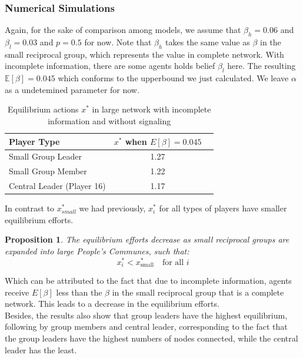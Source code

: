 \documentclass[12pt]{article}
\newtheorem{proposition}{Proposition}
\begin{document}
\subsubsection*{Numerical Simulations}
Again, for the sake of comparison among models, we assume that $\beta_h=0.06$ and $\beta_l=0.03$ and $p=0.5$ for now. Note that $\beta_h$ takes the same value as $\beta$ in the small reciprocal group, which represents the value in complete network. With incomplete information, there are some agents holds belief $\beta_l$ here. The resulting $\mathbb{E}[\beta]=0.045$ which conforms to the upperbound we just calculated. We leave $\alpha$ as a undetemined parameter for now.\\
\begin{table}[H]
  \centering
  \begin{tabular}{lcc}
  \toprule
  \textbf{Player Type}  & \textbf{\( x^* \) when \( E[\beta] = 0.045 \)} \\
  \midrule
  Small Group Leader        & 1.27 \\
  Small Group Member        & 1.22 \\
  Central Leader (Player 16)  & 1.17 \\
  \bottomrule
  \end{tabular}
  \caption{Equilibrium actions \( x^* \) in large network with incomplete information and without signaling}
  \label{tab:xstar-beta}
  \end{table}
In contrast to $x^*_{small}$ we had previously, $x^*_i$ for all types of players have smaller equilibrium efforts.\\
\begin{proposition}
  The equilibrium efforts decrease as small reciprocal groups are expanded into large People's Communes, such that:
  \[
  x^*_i < x^*_{\text{small}} \quad \text{for all } i
  \]
  \end{proposition}
  Which can be attributed to the fact that due to incomplete information, agents receive $E[\beta]$ less than the $\beta$ in the small reciprocal group that is a complete network. This leads to a decrease in the equilibrium efforts.\\
Besides, the results also show that group leaders have the highest equilibrium, following by group members and central leader, corresponding to the fact that the group leaders have the highest numbers of nodes connected, while the central leader has the least.\\
\end{document}
